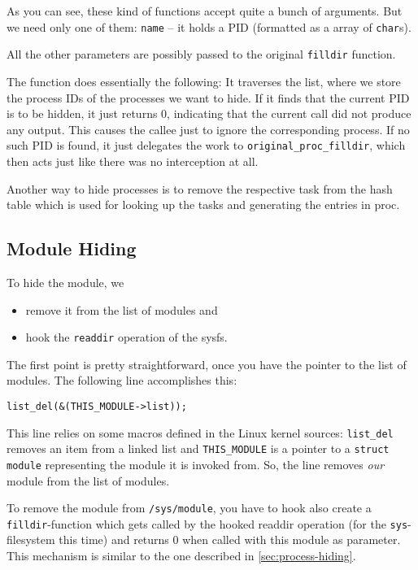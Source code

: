 \documentclass[10pt, letterpaper]{article}
\begin{document}
As you can see, these kind of functions accept quite a bunch of arguments. But we need only one of them: \texttt{name} -- it holds a PID (formatted as a array of \texttt{char}s). 

All the other parameters are possibly passed to the original \texttt{filldir} function.

The function does essentially the following: It traverses the list, where we store the process IDs of the processes we want to hide. If it finds that the current PID is to be hidden, it just returns 0, indicating that the current call did not produce any output. This causes the callee just to ignore the corresponding process. If no such PID is found, it just delegates the work to \texttt{original\_proc\_filldir}, which then acts just like there was no interception at all.

Another way to hide processes is to remove the respective task from the hash table which is used for looking up the tasks and generating the entries in proc.

\subsection{Module Hiding}
\label{sec:module_hiding}

To hide the module, we 
\begin{itemize}
 \item remove it from the list of modules and
 \item hook the \texttt{readdir} operation of the sysfs.
\end{itemize}

The first point is pretty straightforward, once you have the pointer to the list of modules. The following line accomplishes this:

\begin{verbatim}
list_del(&(THIS_MODULE->list));
\end{verbatim}

This line relies on some macros defined in the Linux kernel sources: \texttt{list\_del} removes an item from a linked list and \texttt{THIS\_MODULE} is a pointer to a \texttt{struct module} representing the module it is invoked from. So, the line removes \emph{our} module from the list of modules.

To remove the module from \texttt{/sys/module}, you have to hook also create a \texttt{filldir}-function which gets called by the hooked readdir operation (for the \texttt{sys}-filesystem this time) and returns 0 when called with this module as parameter. This mechanism is similar to the one described in \autoref{sec:process-hiding}.
\end{document}
